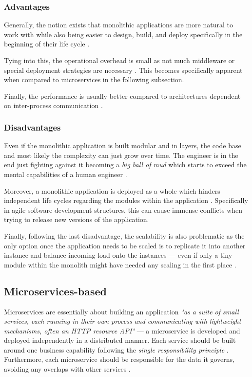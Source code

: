 \documentclass[12pt,a4paper]{report}
\begin{document}
\subsubsection{Advantages}
Generally, the notion exists that monolithic applications are more natural
to work with while also being easier to design, build, and deploy specifically
in the beginning of their life cycle \cite{ms-fowler, raymond2003unix}.

Tying into this, the operational overhead is small as not much middleware or
special deployment strategies are necessary \cite{ms-fowler}.
This becomes specifically apparent when compared to microservices
in the following subsection.

Finally, the performance is usually better compared to architectures dependent
on inter-process communication \cite{knoche2016sustaining}.


\subsubsection{Disadvantages}
Even if the monolithic application is built modular and in layers,
the code base and most likely the complexity can just grow over time.
The engineer is in the end just fighting against it becoming a
\textit{big ball of mud} which starts to exceed the mental capabilities of a
human engineer \cite{newman2015building, foote1997bigballofmud, france2007model}.

Moreover, a monolithic application is deployed as a whole which hinders
independent life cycles regarding the modules within the application \cite{ms-fowler}.
Specifically in agile software development structures, this can cause immense
conflicts when trying to release new versions of the application.

Finally, following the last disadvantage, the scalability is also problematic
as the only option once the application needs to be scaled is to replicate it
into another instance and balance incoming load onto the instances ---
even if only a tiny module within the monolith might have needed any scaling
in the first place \cite{ms-fowler, newman2015building}.


\subsection{Microservices\hyp based}

Microservices are essentially about building an application
\textit{"as a suite of small services, each running in their own process and
communicating with lightweight mechanisms, often an HTTP resource API"}
\cite{ms-fowler} --- a microservice is developed and deployed independently
in a distributed manner.
Each service should be built around one business capability following the
\textit{single responsibility principle} \cite{newman2015building, martin2003agile}.
Furthermore, each microservice should be responsible for the data it governs,
avoiding any overlaps with other services \cite{ms-fowler}.
\end{document}
